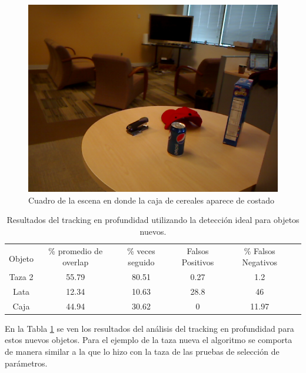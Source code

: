 \begin{figure}[t]
	\centering
	\includegraphics[width=\textwidth]{img/caja_de_costado.png}
	\caption{Cuadro de la escena en donde la caja de cereales aparece de costado}
	\label{fig:caja_de_costado}
\end{figure}



\begin{table}[h]
	\centering
    \begin{tabular}{|c|c|c|c|c|c|}
    \hline
    & \multirow{2}{2.4cm}{\% promedio de overlap} & \multirow{2}{2cm}{\% veces seguido} & \multirow{2}{1.6cm}{Falsos Positivos} & \multirow{2}{1.6cm}{\% Falsos Negativos}\\
	Objeto & & & &\\
    \hline
    Taza 2  & 55.79      & 80.51     & 0.27     &   1.2 \\
    \hline
    Lata    & 12.34      & 10.63     & 28.8     &    46 \\
    \hline
    Caja    & 44.94      & 30.62     & 0        & 11.97 \\
    \hline
    \end{tabular}
\caption{Resultados del tracking en profundidad utilizando la detección ideal para objetos nuevos.}
\label{tabla_d_nuevos}
\end{table}

En la Tabla \ref{tabla_d_nuevos} se ven los resultados del análisis del tracking en profundidad para estos nuevos objetos.
Para el ejemplo de la taza nueva el algoritmo se comporta de manera similar a la que lo hizo con la taza de las pruebas de selección de parámetros.

